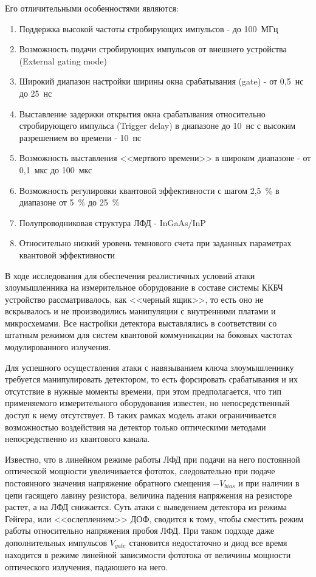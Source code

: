 Его отличительными особенностями являются:
\begin{enumerate}
	\item Поддержка высокой частоты стробирующих импульсов - до 100~МГц
	\item Возможность подачи стробирующих импульсов от внешнего устройства (External gating mode)
	\item Широкий диапазон настройки ширины окна срабатывания (gate) - от 0,5~нс до 25~нс
	\item Выставление задержки открытия окна срабатывания относительно стробирующего импульса (Trigger delay) в диапазоне до 10~нс с высоким разрешением во времени - 10~пс 
	\item Возможность выставления <<мертвого времени>> в широком диапазоне - от 0,1~мкс до 100~мкс
	\item Возможность регулировки квантовой эффективности с шагом 2,5~\% в диапазоне от 5~\% до 25~\%
	\item Полупроводниковая структура ЛФД - InGaAs/InP
	\item Относительно низкий уровень темнового счета при заданных параметрах квантовой эффективности
\end{enumerate}

В ходе исследования для обеспечения реалистичных условий атаки злоумышленника на измерительное оборудование в составе системы ККБЧ устройство рассматривалось, как <<черный ящик>>, то есть оно не вскрывалось и не производились манипуляции с внутренними платами и микросхемами. Все настройки детектора выставлялись в соответствии со штатным режимом для систем квантовой коммуникации на боковых частотах модулированного излучения. 

Для успешного осуществления атаки с навязыванием ключа злоумышленнику требуется манипулировать детектором, то есть форсировать срабатывания и их отсутствие в нужные моменты времени, при этом предполагается, что тип применяемого измерительного оборудования известен, но непосредственный доступ к нему отсутствует. В таких рамках модель атаки ограничивается возможностью воздействия на детектор только оптическими методами непосредственно из квантового канала. 


Известно, что в линейном режиме работы ЛФД при подачи на него постоянной оптической мощности увеличивается фототок, следовательно при подаче постоянного значения напряжение обратного смещения $-V_{bias}$ и при наличии в цепи гасящего лавину резистора, величина падения напряжения на резисторе растет, а на ЛФД снижается. Суть атаки с выведением детектора из режима Гейгера, или <<ослеплением>> ДОФ, сводится к тому, чтобы сместить режим работы относительно напряжения пробоя ЛФД. При таком подходе даже дополнительных импульсов $V_{gate}$ становится недостаточно и диод все время находится в режиме линейной зависимости фототока от величины мощности оптического излучения, падаюшего на него.  

